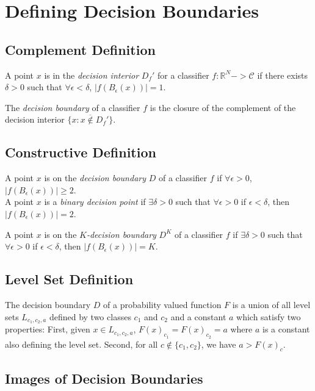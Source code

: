 \section{Defining Decision Boundaries}

\subsection{Complement Definition}

A point $x$ is in the \emph{decision interior} $D_f'$ for a classifier $f: \mathbb{R}^N -> \mathcal{C}$ if there exists $\delta > 0$ such that $\forall \epsilon < \delta$, $|f(B_\epsilon(x))| = 1$. 

The \emph{decision boundary} of a classifier $f$ is the closure of the complement of the decision interior $\overline{\{x : x \notin D_f'\}}$. 

\subsection{Constructive Definition}

A point $x$ is on the \emph{decision boundary} $D$ of a classifier $f$ if $\forall \epsilon > 0$, $|f(B_\epsilon(x))| \geq 2$.\\

A point $x$ is a \emph{binary decision point} if $\exists \delta > 0$ such that $\forall \epsilon > 0$ if $\epsilon < \delta$, then $|f(B_\epsilon(x))| = 2$. 

A point $x$ is on the \emph{$K$-decision boundary} $D^K$ of a classifier $f$ if $\exists \delta > 0$ such that $\forall \epsilon > 0$ if $\epsilon < \delta$, then $|f(B_\epsilon(x))| = K$. 

\subsection{Level Set Definition}

The decision boundary $D$ of a probability valued function $F$ is a union of all level sets $L_{c_1, c_2, a}$ defined by two classes $c_1$ and $c_2$ and a constant $a$ which satisfy two properties: First, given $x \in L_{c_1, c_2, a}$, $F(x)_{c_1} = F(x)_{c_2} = a$ where $a$ is a constant also defining the level set. Second, for all $c \notin \{c_1, c_2\}$, we have $a > F(x)_c$.   

\subsection{Images of Decision Boundaries}

